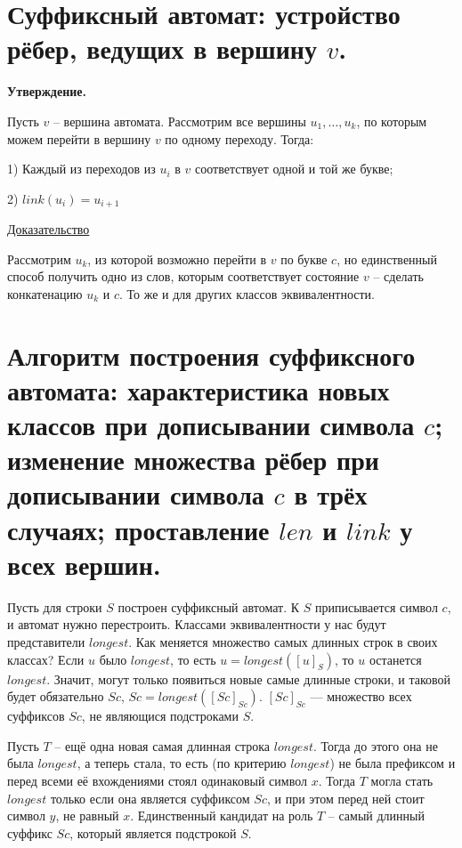 \newpage{}

\section{Суффиксный автомат: устройство рёбер, ведущих в вершину $v$.}

\textbf{Утверждение.}

Пусть $v$ -- вершина автомата. Рассмотрим все вершины $u_1, \ldots, u_k$, по которым можем перейти в вершину $v$ по одному переходу. Тогда:

1) Каждый из переходов  из $u_i$ в $v$ соответствует одной и той же букве;

2) $link(u_i) = u_{i + 1}$

\underline{Доказательство}

Рассмотрим $u_k$, из которой возможно перейти в $v$ по букве $c$, 
но единственный способ получить одно из слов, которым соответствует состояние $v$ -- сделать конкатенацию $u_k$ и $c$. То же и для других классов эквивалентности.

\newpage{}

\section{Алгоритм построения суффиксного автомата: характеристика новых классов при дописывании символа $c$; изменение множества рёбер при дописывании символа $c$ в трёх случаях; проставление $len$ и $link$ у всех вершин.}

Пусть для строки $S$ построен суффиксный автомат. К $S$ приписывается символ $c$, и автомат нужно перестроить. Классами эквивалентности у нас будут представители $longest$. Как меняется множество самых длинных строк в своих классах? Если $u$ было $longest$, то есть $u = longest({[u]}_S)$, то $u$ останется $longest$. Значит, могут только появиться новые самые длинные строки, и таковой будет обязательно $Sc$, $Sc = longest({[Sc]}_{Sc})$. ${[Sc]}_{Sc}$ — множество всех суффиксов $Sc$, не являющися подстроками $S$.

Пусть $T$ -- ещё одна новая самая длинная строка $longest$. Тогда до этого она не была $longest$, а теперь стала, то есть (по критерию $longest$) не была префиксом и перед всеми её вхождениями стоял одинаковый символ $x$. Тогда $T$ могла стать $longest$ только если она является суффиксом $Sc$, и при этом перед ней стоит символ $y$, не равный $x$. Единственный кандидат на роль $T$ -- самый длинный суффикс $Sc$, который является подстрокой $S$.

